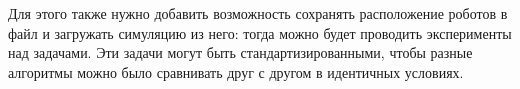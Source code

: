 \documentclass[%
]{report}
\begin{document}
Для этого также нужно добавить возможность сохранять расположение роботов
в файл и загружать симуляцию из него:
тогда можно будет проводить эксперименты
над задачами.
Эти задачи могут быть стандартизированными,
чтобы разные алгоритмы можно было сравнивать друг с другом
в идентичных условиях.









\end{document}
